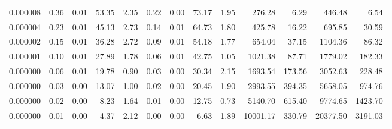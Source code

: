 \begin{tabular}{lrrrrrrrrrrrr}
0.000008 & 0.36 & 0.01 & 53.35 & 2.35 & 0.22 & 0.00 & 73.17 & 1.95 & 276.28 & 6.29 & 446.48 & 6.54 \\
0.000004 & 0.23 & 0.01 & 45.13 & 2.73 & 0.14 & 0.01 & 64.73 & 1.80 & 425.78 & 16.22 & 695.85 & 30.59 \\
0.000002 & 0.15 & 0.01 & 36.28 & 2.72 & 0.09 & 0.01 & 54.18 & 1.77 & 654.04 & 37.15 & 1104.36 & 86.32 \\
0.000001 & 0.10 & 0.01 & 27.89 & 1.78 & 0.06 & 0.01 & 42.75 & 1.05 & 1021.38 & 87.71 & 1779.02 & 182.33 \\
0.000000 & 0.06 & 0.01 & 19.78 & 0.90 & 0.03 & 0.00 & 30.34 & 2.15 & 1693.54 & 173.56 & 3052.63 & 228.48 \\
0.000000 & 0.03 & 0.00 & 13.07 & 1.00 & 0.02 & 0.00 & 20.45 & 1.90 & 2993.55 & 394.35 & 5658.05 & 974.76 \\
0.000000 & 0.02 & 0.00 & 8.23 & 1.64 & 0.01 & 0.00 & 12.75 & 0.73 & 5140.70 & 615.40 & 9774.65 & 1423.70 \\
0.000000 & 0.01 & 0.00 & 4.37 & 2.12 & 0.00 & 0.00 & 6.63 & 1.89 & 10001.17 & 330.79 & 20377.50 & 3191.03 \\
\bottomrule
\end{tabular}
